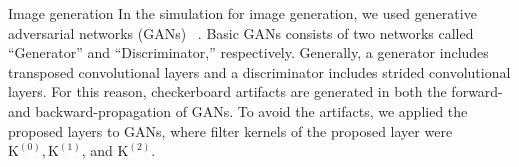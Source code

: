 \documentclass{article}
\makeatletter
\renewcommand\subsection{\@startsection{subsection}{2}{\z@}
                      {0.5ex \@plus 0ex \@minus -2ex}
                      {0.5ex \@plus 0ex}
                      {\normalfont\large\bfseries}}
\newcommand{\mytensor}[1]{\boldsymbol{\mathrm{#1}}}
\makeatother
\begin{document}
\subsection{Image generation}
  In the simulation for image generation,
  we used generative adversarial networks (GANs)
  ~\cite{goodfellow2014generative, radford2015unsupervised}.
  Basic GANs consists of two networks called ``Generator'' and ``Discriminator,''
  respectively.
  Generally,
  a generator includes transposed convolutional layers
  and a discriminator includes strided convolutional layers.
  For this reason,
  checkerboard artifacts are generated in both the forward- and backward-propagation
  of GANs.
  To avoid the artifacts, we applied the proposed layers to GANs,
  where filter kernels of the proposed layer were
  $\mytensor{K}^{(0)}, \mytensor{K}^{(1)}$, and $\mytensor{K}^{(2)}$.
\end{document}

